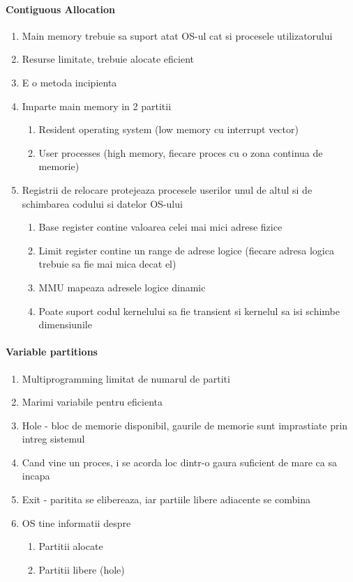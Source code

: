 \documentclass{article}
\begin{document}
\paragraph*{Contiguous Allocation}
\begin{enumerate}
    \item Main memory trebuie sa suport atat OS-ul cat si procesele utilizatorului
    \item Resurse limitate, trebuie alocate eficient
    \item E o metoda incipienta
    \item Imparte main memory in 2 partitii
          \begin{enumerate}
              \item Resident operating system (low memory cu interrupt vector)
              \item User processes (high memory, fiecare proces cu o zona continua de memorie)
          \end{enumerate}
    \item Registrii de relocare protejeaza procesele userilor unul de altul si de schimbarea codului si datelor OS-ului
          \begin{enumerate}
              \item Base register contine valoarea celei mai mici adrese fizice
              \item Limit register contine un range de adrese logice (fiecare adresa logica trebuie sa fie mai mica decat el)
              \item MMU mapeaza adresele logice dinamic
              \item Poate suport codul kernelului sa fie transient si kernelul sa isi schimbe dimensiunile
          \end{enumerate}
\end{enumerate}

\paragraph*{Variable partitions}
\begin{enumerate}
    \item Multiprogramming limitat de numarul de partiti
    \item Marimi variabile pentru eficienta
    \item Hole - bloc de memorie disponibil, gaurile de memorie sunt imprastiate prin intreg sistemul
    \item Cand vine un proces, i se acorda loc dintr-o gaura suficient de mare ca sa incapa
    \item Exit - paritita se elibereaza, iar partiile libere adiacente se combina
    \item OS tine informatii despre
          \begin{enumerate}
              \item Partitii alocate
              \item Partitii libere (hole)
          \end{enumerate}
\end{enumerate}
\end{document}
